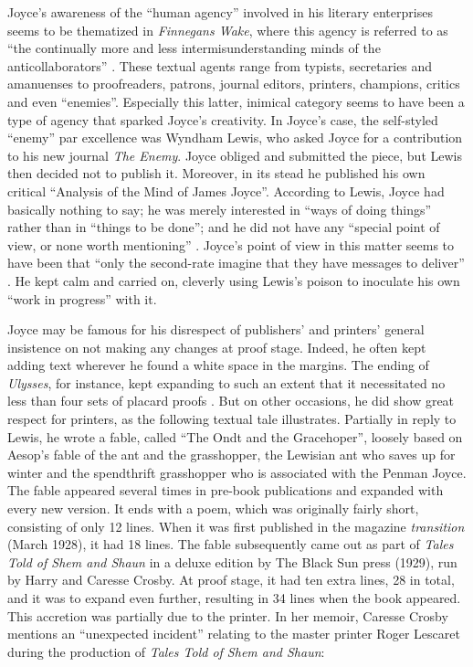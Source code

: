 \begin{paper}
Joyce's awareness of the ``human agency'' involved in his literary
enterprises seems to be thematized in \emph{Finnegans Wake}, where this
agency is referred to as ``the continually more and less
intermisunderstanding minds of the anticollaborators'' \citep[118.25]{joyce_finnegans_1939}. These textual agents range from typists, secretaries and
amanuenses to proofreaders, patrons, journal editors, printers,
champions, critics and even ``enemies''. Especially this latter,
inimical category seems to have been a type of agency that sparked
Joyce's creativity. In Joyce's case, the self-styled ``enemy'' par
excellence was Wyndham Lewis, who asked Joyce for a contribution to his
new journal \emph{The Enemy}. Joyce obliged and submitted the piece, but
Lewis then decided not to publish it. Moreover, in its stead he
published his own critical ``Analysis of the Mind of James Joyce''.
According to Lewis, Joyce had basically nothing to say; he was merely
interested in ``ways of doing things'' rather than in ``things to be
done''; and he did not have any ``special point of view, or none worth
mentioning'' \citep[88]{lewis_time_1993}. Joyce's point of view in this
matter seems to have been that ``only the second-rate imagine that they
have messages to deliver'' \citep{banville_waiting_1989}. He kept calm and carried on,
cleverly using Lewis's poison to inoculate his own ``work in progress''
with it.

Joyce may be famous for his disrespect of publishers' and printers'
general insistence on not making any changes at proof stage. Indeed, he
often kept adding text wherever he found a white space in the margins.
The ending of \emph{Ulysses}, for instance, kept expanding to such an
extent that it necessitated no less than four sets of placard proofs \citep[179]{sullivan_work_2013}. But on other occasions, he did show great respect
for printers, as the following textual tale illustrates. Partially in
reply to Lewis, he wrote a fable, called ``The Ondt and the
Gracehoper'', loosely based on Aesop's fable of the ant and the
grasshopper, the Lewisian ant who saves up for winter and the
spendthrift grasshopper who is associated with the Penman Joyce. The
fable appeared several times in pre-book publications \citep[143ff.]{van_hulle_james_2016} and expanded with every new version. It ends with a poem, which
was originally fairly short, consisting of only 12 lines. When it was
first published in the magazine \emph{transition} (March 1928), it had
18 lines. The fable subsequently came out as part of \emph{Tales Told of
Shem and Shaun} in a deluxe edition by The Black Sun press (1929), run
by Harry and Caresse Crosby. At proof stage, it had ten extra lines, 28
in total, and it was to expand even further, resulting in 34 lines when
the book appeared. This accretion was partially due to the printer. In
her memoir, Caresse Crosby mentions an ``unexpected incident'' relating
to the master printer Roger Lescaret during the production of
\emph{Tales Told of Shem and Shaun}:


\end{paper}
